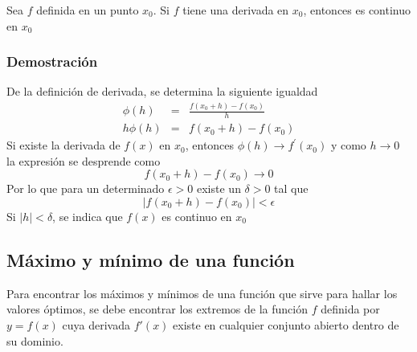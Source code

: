 \begin{theorem}
	Sea $f$ definida en un punto $x_0$. Si $f$ tiene una derivada en $x_0$, entonces es continuo en $x_0$
\end{theorem}
\subsubsection{Demostración}
De la definición de derivada, se determina la siguiente igualdad
\begin{eqnarray}
	\phi(h) &=& \frac{f({x}_{0}+h)-f({x}_{0})}{h} \nonumber \\
	h \phi(h) &=& f({x}_{0}+h)-f({x}_{0}) \nonumber
\end{eqnarray}
Si existe la derivada de $f(x)$ en ${x}_{0}$, entonces $\phi(h) \rightarrow {f}^{'}({x}_{0})$ y como $h \rightarrow 0$ la expresión se desprende como
$$
f({x}_{0}+h) - f({x}_{0}) \rightarrow 0
$$
Por lo que para un determinado $\epsilon > 0$ existe un $\delta > 0$ tal que
$$
\lvert f({x}_{0}+h)-f({x}_{0}) \rvert < \epsilon
$$
Si $\lvert h \rvert < \delta$, se indica que $f(x)$ es continuo en ${x}_{0}$


\subsection{Máximo y mínimo de una función}
Para encontrar los máximos y mínimos de una función que sirve para hallar los valores óptimos, se debe encontrar los extremos de la función $f$ definida por $y=f(x)$ cuya derivada $f'(x)$ existe en cualquier conjunto abierto dentro de su dominio. \citep{Khuri_2002}

